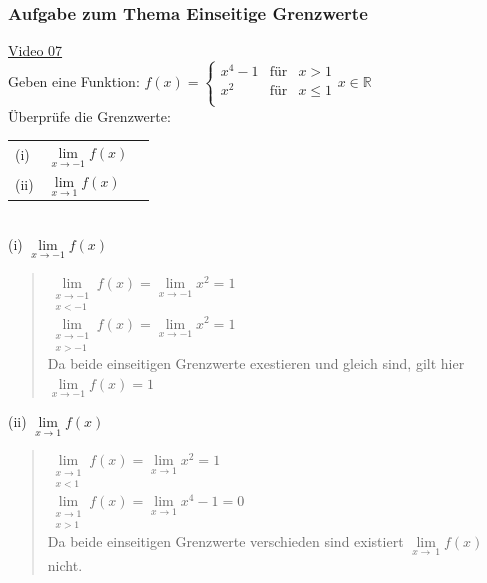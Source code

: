 \subsubsection{Aufgabe zum Thema Einseitige Grenzwerte}
\href{https://youtu.be/3QFihiHQzq0}{Video 07}\\
Geben eine Funktion:  $f(x) =     \left\{ \begin{array}{lll}
	x^4-1&\mbox{für} & x>1\\
	x^2 &\mbox{für} & x\leq 1 \\
	
\end{array}\right.$\;\;\;\;$ x\in\mathbb{R} $\\
Überprüfe die Grenzwerte:\\
\begin{tabular}[t]{lll}%
	(i) & $ \lim\limits_ {x\to -1}f(x) $  \\
	(ii) & $ \lim\limits_ {x\to 1}f(x) $ \\	
\end{tabular} \vspace*{2mm}\\
(i) \;\;$\lim\limits_ {x\to -1}f(x)$\\
\begin{quote}
	\textbullet \;\; $ \lim\limits_ {\substack{x\to -1\\x<-1}}f(x) =\lim\limits_ {x\to -1}x^2=1$\\
	\textbullet \;\;$ \lim\limits_ {\substack{x\to -1\\x>-1}}f(x) =\lim\limits_ {x\to -1}x^2=1$\\
	Da beide einseitigen Grenzwerte exestieren und gleich sind, gilt hier $ \lim\limits_ {x\to -1}f(x)=1 $\\
\end{quote}
(ii) \;\;$\lim\limits_ {x\to 1}f(x)$\\
\begin{quote}
	\textbullet \;\; $ \lim\limits_ {\substack{x\to 1\\x<1}}f(x) =\lim\limits_ {x\to 1}x^2=1$\\
	\textbullet \;\; $ \lim\limits_ {\substack{x\to 1\\x>1}}f(x) =\lim\limits_ {x\to 1}x^4-1=0$\\
	Da beide einseitigen Grenzwerte verschieden sind existiert $ \lim\limits_ {x\to\ 1}f(x) $ nicht.\\
\end{quote}
